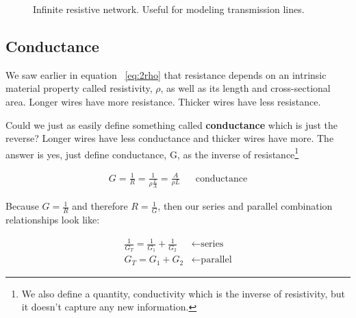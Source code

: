 \begin{figure}[H]
\begin{center}
\caption{Infinite resistive network. Useful for modeling transmission lines.}
\label{F:3TRANS}
\end{center}
\end{figure}



\subsection{Conductance}
We saw earlier in equation ~\eqref{eq:2rho} that resistance depends on an intrinsic material property called resistivity, $\rho$, as well as its length and cross-sectional area. Longer wires have more resistance. Thicker wires have less resistance.\par

Could we just as easily define something called \textbf{conductance} which is just the reverse? Longer wires have less conductance and thicker wires have more. The answer is yes, just define conductance, G, as the inverse of resistance\footnote{We also define a quantity, conductivity which is the inverse of resistivity, but it doesn't capture any new information.}

\begin{align}
G=\frac{1}{R}=\frac{1}{\rho\frac{L}{A}}=\frac{A}{\rho L}&& \text{conductance}
\end{align}

Because $G=\frac{1}{R}$ and therefore $R=\frac{1}{G}$, then our series and parallel combination relationships look like:

\begin{align}
\frac{1}{G_T}=\frac{1}{G_1}+\frac{1}{G_2}&\leftarrow \text{series}\\
G_T=G_1+G_2&\leftarrow \text{parallel}
\end{align}

